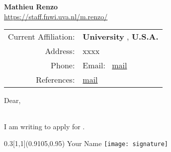 \documentclass[11pt,letter]{article}
\newcounter{TODOLIST}
\begin{document}
\begin{center}
{\LARGE \bf Mathieu Renzo}\\
\vspace{0.1cm}
{
  \footnotesize
 \href{https://staff.fnwi.uva.nl/m.renzo/}{https://staff.fnwi.uva.nl/m.renzo/} \\
}
\begin{tabular}[ht]{rl}
  Current Affiliation: & {\bf University }, {\bf U.S.A.}  \\
  Address: & xxxx\\
  Phone: &    \qquad \qquad Email: \
           \href{mailto:}{mail}\\
References: & \href{mailto:}{mail}

\end{tabular}
\end{center}
\hrulefill

\vspace{0.1cm}

Dear,\\\

I am writing to apply for .





   \begin{textblock}{0.3}[1,1](0.9105,0.95)
     \centering
     Your Name
     \texttt{[image: signature]}
   \end{textblock}



\end{document}
